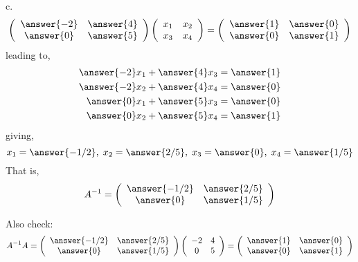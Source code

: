 \documentclass{ximera}
\begin{document}
\begin{exercise}
\begin{prompt}
c. \[
\left(\begin{array}{cc}
\answer{-2} & \answer{4}\\
\answer{0} & \answer{5}
\end{array}\right) \left(\begin{array}{cc}
x_{1} & x_{2}\\
x_{3} & x_{4}
\end{array}\right) = \left(\begin{array}{cc}
\answer{1} & \answer{0}\\
\answer{0} & \answer{1}
\end{array} \right)
\]
leading to,
\begin{eqnarray*}
\answer{-2}x_{1} + \answer{4}x_{3} = \answer{1}\\
\answer{-2}x_{2} + \answer{4}x_{4} = \answer{0}\\
\answer{0}x_{1} + \answer{5}x_{3} = \answer{0}\\
\answer{0}x_{2} + \answer{5}x_{4} = \answer{1}
\end{eqnarray*}
giving, \\
\begin{equation*}
x_{1} = \answer{-1/2}, \hspace{.1cm} x_{2} = \answer{2/5},\hspace{.1cm} x_{3} = \answer{0}, \hspace{.1cm} x_{4} = \answer{1/5}
\end{equation*}
That is,
\[
A^{-1} = \left(\begin{array}{cc}
\answer{-1/2} & \answer{2/5}\\
\answer{0} & \answer{1/5}
\end{array}\right)\]

Also check:
\[A^{-1}A = \left(\begin{array}{cc}
\answer{-1/2} & \answer{2/5}\\
\answer{0} & \answer{1/5}
\end{array}\right)\left(\begin{array}{cc}
-2 & 4\\
0& 5
\end{array}\right)= \left(\begin{array}{cc}
\answer{1} & \answer{0}\\
\answer{0} & \answer{1}
\end{array}\right)
\]




\end{prompt}
\end{exercise}
\end{document}
